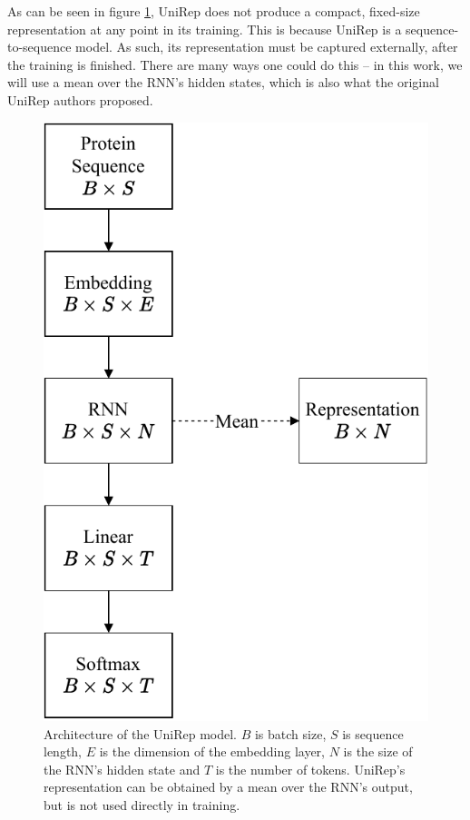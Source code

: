 As can be seen in figure \ref{fig:unirep_architecture}, UniRep does not produce a compact, fixed-size representation at any point in its training. This is because UniRep is a sequence-to-sequence model. As such, its representation must be captured externally, after the training is finished. There are many ways one could do this -- in this work, we will use a mean over the RNN's hidden states, which is also what the original UniRep authors proposed.

\begin{figure}[H]
    \centering
    \includegraphics{report/figures/unirep.pdf}
    \caption{Architecture of the UniRep model. $B$ is batch size, $S$ is sequence length, $E$ is the dimension of the embedding layer, $N$ is the size of the RNN's hidden state and $T$ is the number of tokens. UniRep's representation can be obtained by a mean over the RNN's output, but is not used directly in training.}
    \label{fig:unirep_architecture}
\end{figure}

